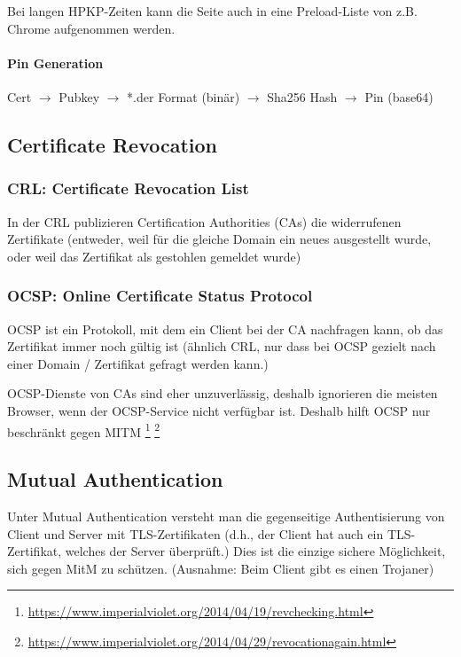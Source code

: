 Bei langen HPKP-Zeiten kann die Seite auch in eine Preload-Liste von z.B. Chrome aufgenommen werden.

\paragraph{Pin Generation}
Cert $\rightarrow$ Pubkey $\rightarrow$ *.der Format (binär) $\rightarrow$ Sha256 Hash $\rightarrow$ Pin (base64)

\subsection{Certificate Revocation}
\subsubsection{CRL: Certificate Revocation List}

In der CRL publizieren Certification Authorities (CAs) die widerrufenen Zertifikate (entweder, weil für die gleiche Domain ein neues ausgestellt wurde, oder weil das Zertifikat als gestohlen gemeldet wurde)

\subsubsection{OCSP: Online Certificate Status Protocol}

OCSP ist ein Protokoll, mit dem ein Client bei der CA nachfragen kann, ob das Zertifikat immer noch gültig ist (ähnlich CRL, nur dass bei OCSP gezielt nach einer Domain / Zertifikat gefragt werden kann.)

OCSP-Dienste von CAs sind eher unzuverlässig, deshalb ignorieren die meisten Browser, wenn der OCSP-Service nicht verfügbar ist. Deshalb hilft OCSP nur beschränkt gegen MITM \footnote{\url{https://www.imperialviolet.org/2014/04/19/revchecking.html}} \footnote{\url{https://www.imperialviolet.org/2014/04/29/revocationagain.html}}

\subsection{Mutual Authentication}

Unter Mutual Authentication versteht man die gegenseitige Authentisierung von Client und Server mit TLS-Zertifikaten (d.h., der Client hat auch ein TLS-Zertifikat, welches der Server überprüft.) Dies ist die einzige sichere Möglichkeit, sich gegen MitM zu schützen. (Ausnahme: Beim Client gibt es einen Trojaner)


